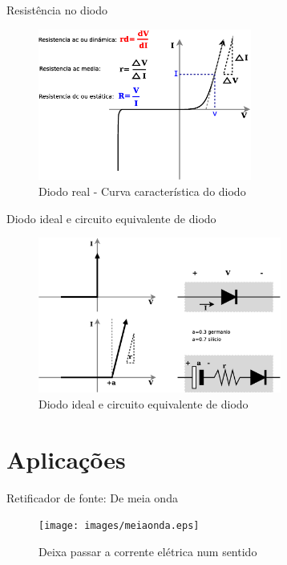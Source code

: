 \documentclass[envcountsect,dvips]{beamer}
\begin{document}
\begin{frame}{Resistência no diodo}
\begin{figure}
\centering
\includegraphics[width=7cm]{images/resaverdia.eps}
\caption{Diodo real -  Curva característica do diodo}
\label{fig:resaverdia}
\end{figure}
\end{frame}

\begin{frame}{Diodo  ideal e circuito equivalente de diodo}
\begin{figure}
\centering
\includegraphics[width=8cm]{images/ideal.eps}
\caption{Diodo ideal e circuito equivalente de diodo}
\label{fig:ideal}
\end{figure}
\end{frame}

\section{Aplicações}
\begin{frame}{Retificador de fonte: De meia onda}
\begin{figure}
\centering
\texttt{[image: images/meiaonda.eps]}
\caption{Deixa passar a corrente elétrica num sentido }
\label{fig:meiaonda}
\end{figure}
\end{frame}
\end{document}
